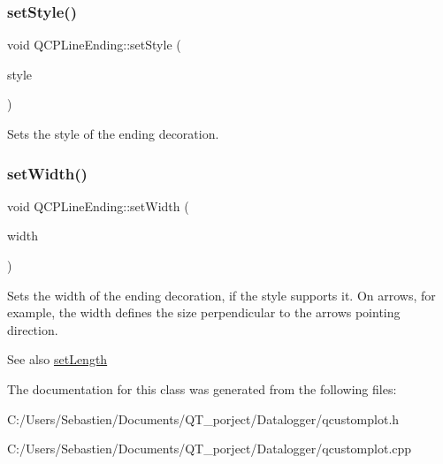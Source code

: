 \subsubsection{\texorpdfstring{set\+Style()}{setStyle()}}
{\footnotesize\ttfamily void Q\+C\+P\+Line\+Ending\+::set\+Style (\begin{DoxyParamCaption}\item[{\hyperlink{class_q_c_p_line_ending_a5ef16e6876b4b74959c7261d8d4c2cd5}{Q\+C\+P\+Line\+Ending\+::\+Ending\+Style}}]{style }\end{DoxyParamCaption})}

Sets the style of the ending decoration. \mbox{\label{class_q_c_p_line_ending_a26dc020ea985a72cc25881ce2115e34e}} 
\subsubsection{\texorpdfstring{set\+Width()}{setWidth()}}
{\footnotesize\ttfamily void Q\+C\+P\+Line\+Ending\+::set\+Width (\begin{DoxyParamCaption}\item[{double}]{width }\end{DoxyParamCaption})}

Sets the width of the ending decoration, if the style supports it. On arrows, for example, the width defines the size perpendicular to the arrow\textquotesingle{}s pointing direction.

\begin{DoxySeeAlso}{See also}
\hyperlink{class_q_c_p_line_ending_ae36fa01763751cd64b7f56c3507e935a}{set\+Length} 
\end{DoxySeeAlso}


The documentation for this class was generated from the following files\+:\begin{DoxyCompactItemize}
\item 
C\+:/\+Users/\+Sebastien/\+Documents/\+Q\+T\+\_\+porject/\+Datalogger/qcustomplot.\+h\item 
C\+:/\+Users/\+Sebastien/\+Documents/\+Q\+T\+\_\+porject/\+Datalogger/qcustomplot.\+cpp\end{DoxyCompactItemize}
